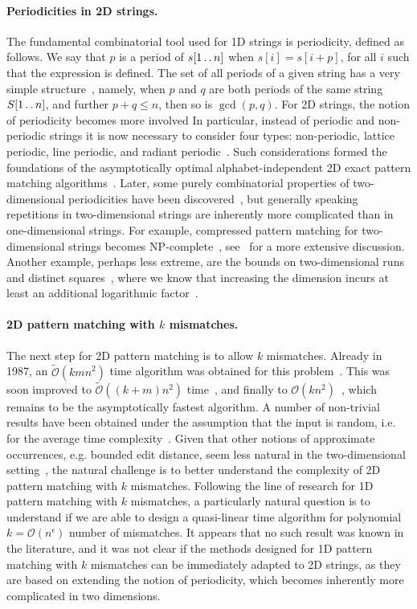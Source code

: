 \documentclass[11pt, letterpaper]{article}
\theoremstyle{plain}
\theoremstyle{definition}
\theoremstyle{remark}
\def\dd{\mathinner{.\,.}}
\renewcommand{\O}{\mathcal{O}}
\newcommand{\tO}{\tilde{\mathcal{O}}}
\begin{document}
\paragraph{Periodicities in 2D strings.} The fundamental combinatorial tool used for 1D strings is periodicity,
defined as follows. We say that $p$ is a period of $s[1 \dd n]$ when $s[i]=s[i+p]$, for all $i$ such that the expression is defined.
The set of all periods of a given string has a very simple structure~\cite{Fine1965}, namely, when $p$ and $q$ are both periods
of the same string $S[1 \dd n]$, and further $p+q\leq n$, then so is $\gcd(p,q)$.
For 2D strings, the notion of periodicity becomes more involved In particular, instead of periodic
and non-periodic strings it is now necessary to consider four types: non-periodic, lattice periodic, line periodic, and
radiant periodic~\cite{Amir1998}. Such considerations formed the foundations of the asymptotically optimal alphabet-independent
2D exact pattern matching algorithms~\cite{Amir1994,Galil1996}.
Later, some purely combinatorial properties of two-dimensional periodicities have been discovered~\cite{Mignosi2003,Gamard2017},
but generally speaking repetitions in two-dimensional strings are inherently more complicated than in one-dimensional strings.
For example, compressed pattern matching for two-dimensional strings becomes NP-complete~\cite{Berman2002}, see~\cite{Rytter2000}
for a more extensive discussion.
Another example, perhaps less extreme, are the bounds on two-dimensional runs~\cite{Amir2020} and
distinct squares~\cite{Charalampopoulos2020}, where we know that increasing the dimension incurs at least an additional
logarithmic factor~\cite{Charalampopoulos2020}.

\paragraph{2D pattern matching with $k$ mismatches.} The next step for 2D pattern matching is to allow $k$ mismatches.
Already in 1987, an $\tO(kmn^{2})$ time algorithm was obtained for this problem~\cite{Krithivasan1987}. This was
soon improved to $\tO((k+m)n^2)$ time~\cite{Ranka1991}, and finally to $\O(kn^2)$~\cite{Amir1991}, which remains
to be the asymptotically fastest algorithm. A number of non-trivial results have been obtained under the assumption
that the input is random, i.e. for the average time complexity~\cite{Baeza-Yates1998,Park1998,Kaerkkaeinen1999}.
Given that other notions of approximate occurrences, e.g. bounded edit distance, seem less natural in the two-dimensional
setting~\cite{Baeza-Yates1998a}, the natural challenge is to better understand the complexity
of 2D pattern matching with $k$ mismatches. Following the line of research for 1D pattern matching with $k$
mismatches, a particularly natural question is to understand if we are able to design a quasi-linear time
algorithm for polynomial $k=\O(n^{\epsilon})$ number of mismatches. It appears that no such result was known
in the literature, and it was not clear if the methods designed for 1D pattern matching with $k$ mismatches
can be immediately adapted to 2D strings, as they are based on extending the notion of periodicity, which becomes
inherently more complicated in two dimensions.
\end{document}
